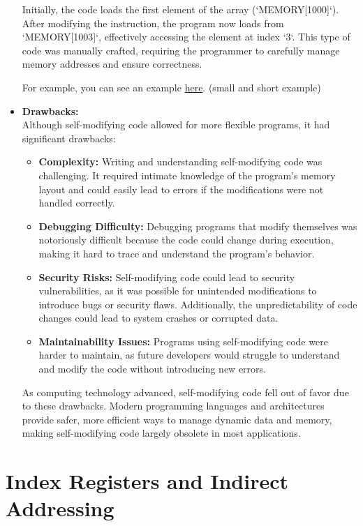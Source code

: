 \documentclass{book}
\begin{document}
\begin{itemize}
		Initially, the code loads the first element of the array (`MEMORY[1000]`). After modifying the instruction, the program now loads from `MEMORY[1003]`, effectively accessing the element at index `3`. This type of code was manually crafted, requiring the programmer to carefully manage memory addresses and ensure correctness.
		
		For example, you can see an example \href{https://github.com/m-mdy-m/Arliz/blob/main/Self-Modifying-Code/index.asm}{here}. (small and short example)
		
		\item \textbf{Drawbacks:} \\
		Although self-modifying code allowed for more flexible programs, it had significant drawbacks:
		\begin{itemize}
			\item \textbf{Complexity:} Writing and understanding self-modifying code was challenging. It required intimate knowledge of the program's memory layout and could easily lead to errors if the modifications were not handled correctly.
			\item \textbf{Debugging Difficulty:} Debugging programs that modify themselves was notoriously difficult because the code could change during execution, making it hard to trace and understand the program's behavior.
			\item \textbf{Security Risks:} Self-modifying code could lead to security vulnerabilities, as it was possible for unintended modifications to introduce bugs or security flaws. Additionally, the unpredictability of code changes could lead to system crashes or corrupted data.
			\item \textbf{Maintainability Issues:} Programs using self-modifying code were harder to maintain, as future developers would struggle to understand and modify the code without introducing new errors.
		\end{itemize}
		
		As computing technology advanced, self-modifying code fell out of favor due to these drawbacks. Modern programming languages and architectures provide safer, more efficient ways to manage dynamic data and memory, making self-modifying code largely obsolete in most applications.
	\end{itemize}
	\section{Index Registers and Indirect Addressing}
		
\end{document}
